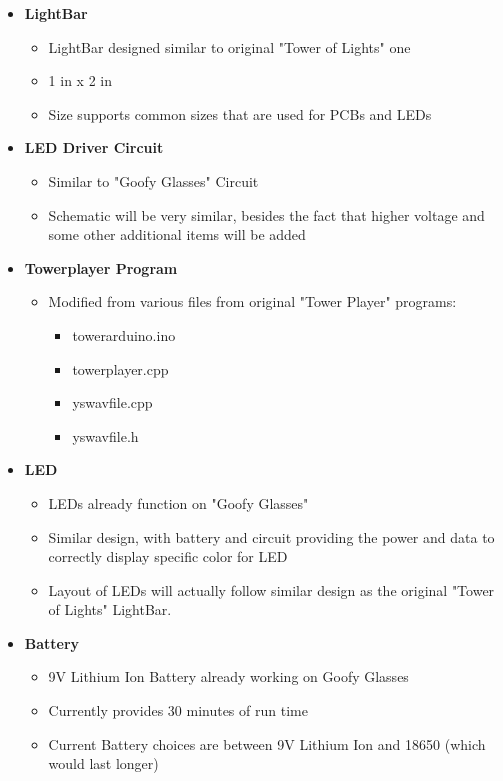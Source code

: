 \documentclass[12pt]{article}
\begin{document}
{{{		%
		{\renewcommand\labelitemi{}
			\begin{itemize}
				\item \textbf{LightBar}
				\begin{itemize}
					\item LightBar designed similar to original "Tower of Lights" one
					\item 1 in x 2 in
					\item Size supports common sizes that are used for PCBs and LEDs
				\end{itemize}
				\item \textbf{LED Driver Circuit}
				\begin{itemize}
					\item Similar to "Goofy Glasses" Circuit
					\item Schematic will be very similar, besides the fact that higher voltage and some other additional items will be added
				\end{itemize}
				\item \textbf{Towerplayer Program}
				\begin{itemize}
					\item Modified from various files from original "Tower Player" programs:
					\begin{itemize}
						\item towerarduino.ino
						\item towerplayer.cpp
						\item yswavfile.cpp
						\item yswavfile.h
					\end{itemize}
				\end{itemize}
				\item \textbf{LED}
				\begin{itemize}
					\item LEDs already function on "Goofy Glasses"
					\item Similar design, with battery and circuit providing the power and data to correctly display specific color for LED
					\item Layout of LEDs will actually follow similar design as the original "Tower of Lights" LightBar.
				\end{itemize}
				\item \textbf{Battery}
				\begin{itemize}
					\item 9V Lithium Ion Battery already working on Goofy Glasses
					\item Currently provides 30 minutes of run time
					\item Current Battery choices are between 9V Lithium Ion and 18650 (which would last longer)
				\end{itemize}
			\end{itemize}
			
}}}}
\end{document}
